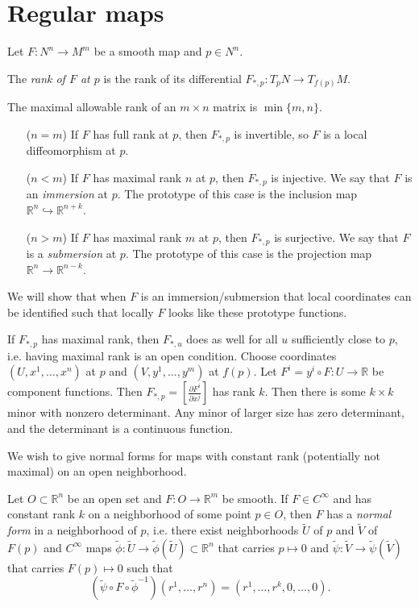 \section{Regular maps}
Let $F: N^n \to M^m$ be a smooth map and $p \in N^n$.
\begin{defn}[Rank]
The \emph{rank of $F$ at $p$} is the rank of its differential
$F_{\ast,p} : T_pN \to T_{f(p)}M$.
\end{defn}

The maximal allowable rank of an
$m \times n$ matrix is $\min\{m, n\}$.
\begin{itemize}
  \item[($n = m$)]{
    If $F$ has full rank at $p$, then $F_{\ast,p}$ is invertible, so
    $F$ is a local diffeomorphism at $p$.
  }
  \item[($n < m$)]{
    If $F$ has maximal rank $n$ at $p$, then $F_{\ast,p}$ is injective. We
    say that $F$ is an \emph{immersion} at $p$. The prototype of this
    case is the inclusion map $\mathbb{R}^n \hookrightarrow \mathbb{R}^{n+k}$.
  }
  \item[($n > m$)]{
    If $F$ has maximal rank $m$ at $p$, then $F_{\ast, p}$ is
    surjective. We say that $F$ is a \emph{submersion} at $p$. The
    prototype of this case is the projection map
    $\mathbb{R}^n \to \mathbb{R}^{n-k}$.
  }
\end{itemize}

We will show that when $F$ is an immersion/submersion that local
coordinates can be identified such that locally $F$ looks like these
prototype functions.

\begin{remark}
If $F_{\ast, p}$ has maximal rank, then $F_{\ast, u}$ does as well for
all $u$ sufficiently close to $p$, i.e. having maximal rank is an open
condition. Choose coordinates $(U, x^1, \dots, x^n)$ at $p$
and $(V, y^1, \dots, y^m)$ at $f(p)$. Let
$F^i = y^i \circ F : U \to \mathbb{R}$ be component functions. Then
$F_{\ast, p} = \left[\frac{\partial F^i}{\partial x^j}\right]$ has
rank $k$. Then there is some $k \times k$ minor with nonzero
determinant. Any minor of larger size has zero determinant,
 and the determinant is a continuous function.
\end{remark}

We wish to give normal forms for maps with constant rank (potentially
not maximal) on an open neighborhood.

\begin{theorem}
Let $O \subset \mathbb{R}^n$ be an open set and
$F: O \to \mathbb{R}^m$ be smooth.
If $F \in C^\infty$ and has constant rank $k$ on a neighborhood of
some point $p \in O$, then $F$ has a \emph{normal form} in a
neighborhood of $p$, i.e. there exist neighborhoods
$\tilde{U}$ of $p$ and $\tilde{V}$ of $F(p)$ and
$C^\infty$ maps
$\tilde{\phi}: \tilde{U} \to \tilde{\phi}(\tilde{U}) \subset \mathbb{R}^n$
that carries $p \mapsto 0$ and
$\tilde{\psi} : \tilde{V} \to \tilde{\psi}(\tilde{V})$ that carries
$F(p) \mapsto 0$ such that
$$
  (\tilde{\psi} \circ F \circ \tilde{\phi}^{-1})
    (r^1, \dots, r^n)
= (r^1, \dots, r^k, 0, \dots, 0).
$$
\end{theorem}

